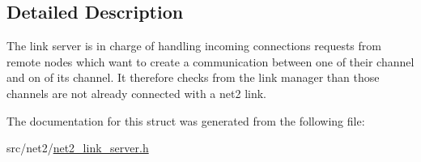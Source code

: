 \subsection{Detailed Description}
The link server is in charge of handling incoming connections requests from remote nodes which want to create a communication between one of their channel and on of its channel. It therefore checks from the link manager than those channels are not already connected with a net2 link. 

The documentation for this struct was generated from the following file\-:\begin{DoxyCompactItemize}
\item 
src/net2/\hyperlink{net2__link__server_8h}{net2\-\_\-link\-\_\-server.\-h}\end{DoxyCompactItemize}
